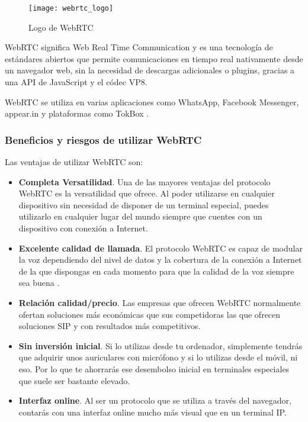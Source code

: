 \begin{figure}[htp!]
  \centering
  \texttt{[image: webrtc\_logo]}
  \caption{Logo de WebRTC}
  \label{fig:webrtc_logo}
\end{figure}

WebRTC significa Web Real Time Communication y es una tecnología de estándares abiertos que permite comunicaciones en tiempo real nativamente desde un navegador web, sin la necesidad de descargas adicionales o plugins, gracias a una API de JavaScript y el códec VP8. \cite{webrtc3}

WebRTC se utiliza en varias aplicaciones como WhatsApp, Facebook Messenger, appear.in y plataformas como TokBox \cite{webrtc3}.

\subsubsection{Beneficios y riesgos de utilizar WebRTC}

Las ventajas de utilizar WebRTC son:

\begin{itemize}
  \item \textbf{Completa Versatilidad}. Una de las mayores ventajas del protocolo WebRTC es la versatilidad que ofrece. Al poder utilizarse en cualquier dispositivo sin necesidad de disponer de un terminal especial, puedes utilizarlo en cualquier lugar del mundo siempre que cuentes con un dispositivo con conexión a Internet.
  \item \textbf{Excelente calidad de llamada}. El protocolo WebRTC es capaz de modular la voz dependiendo del nivel de datos y la cobertura de la conexión a Internet de la que dispongas en cada momento para que la calidad de la voz siempre sea buena \cite{webrtc1}.
  \item \textbf{Relación calidad/precio}. Las empresas que ofrecen WebRTC normalmente ofertan soluciones más económicas que sus competidoras las que ofrecen soluciones SIP y con resultados más competitivos.
  \item \textbf{Sin inversión inicial}. Si lo utilizas desde tu ordenador, simplemente tendrás que adquirir unos auriculares con micrófono y si lo utilizas desde el móvil, ni eso. Por lo que te ahorrarás ese desembolso inicial en terminales especiales que suele ser bastante elevado.
  \item \textbf{Interfaz online}. Al ser un protocolo que se utiliza a través del navegador, contarás con una interfaz online mucho más visual que en un terminal IP.
\end{itemize}

